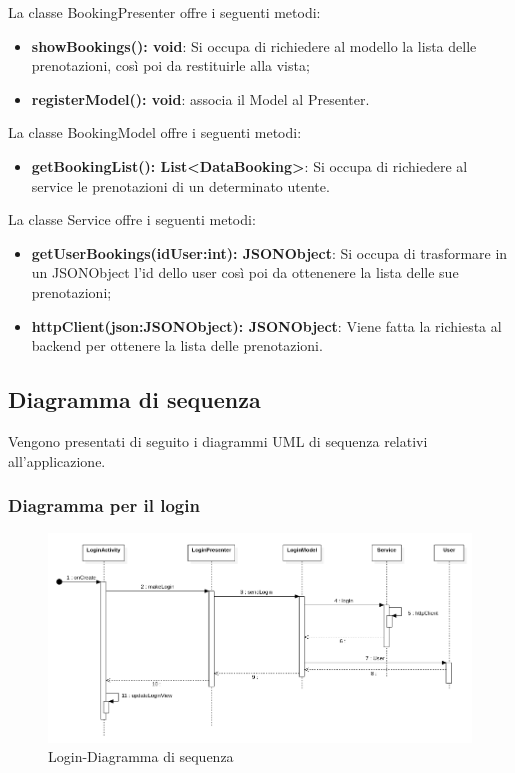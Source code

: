 La classe BookingPresenter offre i seguenti metodi:
\begin{itemize}
	\item \textbf{showBookings(): void}: Si occupa di richiedere al modello la lista delle prenotazioni, così poi da restituirle alla vista; 
	\item \textbf{registerModel(): void}: associa il Model al Presenter.
\end{itemize}

La classe BookingModel offre i seguenti metodi:
\begin{itemize}
	\item \textbf{getBookingList(): List<DataBooking>}: Si occupa di richiedere al service le prenotazioni di un determinato utente. 
\end{itemize}

La classe Service offre i seguenti metodi:
\begin{itemize}
	\item \textbf{getUserBookings(idUser:int): JSONObject}: Si occupa di trasformare in un JSONObject l'id dello user così poi da ottenenere la lista delle sue prenotazioni;
	\item \textbf{httpClient(json:JSONObject): JSONObject}: Viene fatta la richiesta al backend per ottenere la lista delle prenotazioni.
 
\end{itemize}

\subsection{Diagramma di sequenza}
Vengono presentati di seguito i diagrammi UML di sequenza relativi all'applicazione.

\subsubsection{Diagramma per il login}
\begin{figure}[H]
	\centering
	\includegraphics[width=16cm]{res/images/loginSeq.png}
	\caption{Login-Diagramma di sequenza}
	\label{fig:Login-Diagramma di sequenza}
\end{figure}

